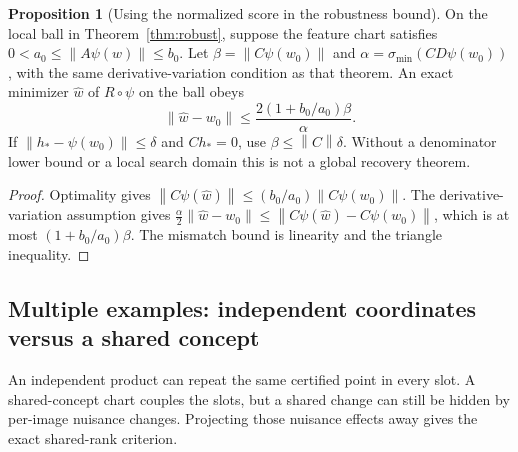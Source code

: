 \documentclass[11pt,a4paper]{article}
\theoremstyle{definition}
\newtheorem{proposition}[theorem]{Proposition}
\theoremstyle{definition}
\theoremstyle{remark}\newtheorem{remark}[theorem]{Remark}
\newcommand{\smin}{\sigma_{\min}}\newcommand{\smax}{\sigma_{\max}}
\newcommand{\norm}[1]{\left\lVert #1\right\rVert}
\begin{document}
\begin{proposition}[Using the normalized score in the robustness bound]\label{prop:scorerobust}
On the local ball in Theorem~\ref{thm:robust}, suppose the feature chart satisfies
$0<a_0\le\norm{A\psi(w)}\le b_0$. Let $\beta=\norm{C\psi(w_0)}$ and $\alpha=\smin(CD\psi(w_0))$, with the same derivative-variation condition as that theorem. An exact minimizer $\widehat w$ of $R\circ\psi$ on the ball obeys
\[
\norm{\widehat w-w_0}\le\frac{2(1+b_0/a_0)\beta}{\alpha}.
\]
If $\norm{h_*-\psi(w_0)}\le\delta$ and $Ch_*=0$, use $\beta\le\norm C\delta$. Without a denominator lower bound or a local search domain this is not a global recovery theorem.
\end{proposition}
\begin{proof}
Optimality gives $\norm{C\psi(\widehat w)}\le(b_0/a_0)\norm{C\psi(w_0)}$. The derivative-variation assumption gives $\frac\alpha2\norm{\widehat w-w_0}\le\norm{C\psi(\widehat w)-C\psi(w_0)}$, which is at most $(1+b_0/a_0)\beta$. The mismatch bound is linearity and the triangle inequality.
\end{proof}

\subsection{Multiple examples: independent coordinates versus a shared concept}

An independent product can repeat the same certified point in every slot. A shared-concept chart couples the slots, but a shared change can still be hidden by per-image nuisance changes. Projecting those nuisance effects away gives the exact shared-rank criterion.
\end{document}
